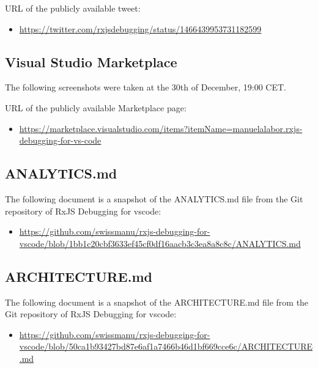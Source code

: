 URL of the publicly available tweet:

\begin{itemize}
  \item \url{https://twitter.com/rxjsdebugging/status/1466439953731182599}
\end{itemize}




\subsection{Visual Studio Marketplace}
\label{sec:marketplace}
The following screenshots were taken at the 30th of December, 19:00 CET.

URL of the publicly available Marketplace page:

\begin{itemize}
  \item \url{https://marketplace.visualstudio.com/items?itemName=manuelalabor.rxjs-debugging-for-vs-code}
\end{itemize}





\subsection{ANALYTICS.md}
\label{sec:analytics}
The following document is a snapshot of the ANALYTICS.md file from the Git repository of RxJS Debugging for vscode:

\begin{itemize}
  \item \url{https://github.com/swissmanu/rxjs-debugging-for-vscode/blob/1bb1c20cbf3633ef45cf0df16aacb3c3ea8a8c8c/ANALYTICS.md}
\end{itemize}




\subsection{ARCHITECTURE.md}
\label{sec:architecture}
The following document is a snapshot of the ARCHITECTURE.md file from the Git repository of RxJS Debugging for vscode:

\begin{itemize}
  \item \url{https://github.com/swissmanu/rxjs-debugging-for-vscode/blob/50ca1b93427bd87e6af1a7466b46d1bf669cce6c/ARCHITECTURE.md}
\end{itemize}


